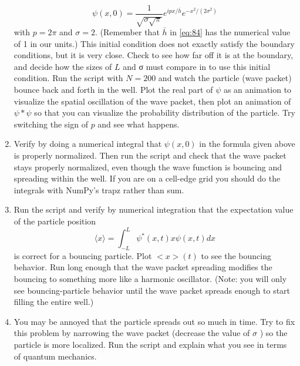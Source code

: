 \begin{problem}
\begin{enumerate}[label=(\alph*)]
\begin{equation}\label{eq:84}
\psi(x, 0)=\frac{1}{\sqrt{\sigma \sqrt{\pi}}} e^{i p x / \bar{h}} e^{-x^{2} /\left(2 \sigma^{2}\right)}
\end{equation}
with $p = 2\pi$ and $\sigma = 2$. (Remember that $ \bar{h}$ in \eqref{eq:84} has the numerical
value of 1 in our units.) This initial condition does not exactly satisfy
the boundary conditions, but it is very close. Check to see how far
off it is at the boundary, and decide how the sizes of $L$ and σ must
compare in to use this initial condition.
Run the script with $N = 200$ and watch the particle (wave packet)
bounce back and forth in the well. Plot the real part of $\psi$ as an animation to visualize the spatial oscillation of the wave packet, then
plot an animation of $\psi * \psi$  so that you can visualize the probability
distribution of the particle. Try switching the sign of $p$ and see what
happens.
\item Verify by doing a numerical integral that $\psi(x,0)$ in the formula given
above is properly normalized. Then run the script and check that
the wave packet stays properly normalized, even though the wave
function is bouncing and spreading within the well. If you are on a
cell-edge grid you should do the integrals with NumPy\rq s trapz rather
than sum.
\item Run the script and verify by numerical integration that the expectation
value of the particle position
\begin{equation}\label{eq:85}
\langle x\rangle=\int_{-L}^{L} \psi^{*}(x, t) x \psi(x, t) d x
\end{equation}
is correct for a bouncing particle. Plot $<x>(t)$ to see the bouncing
behavior. Run long enough that the wave packet spreading modifies
the bouncing to something more like a harmonic oscillator. (Note:
you will only see bouncing-particle behavior until the wave packet
spreads enough to start filling the entire well.)
\item You may be annoyed that the particle spreads out so much in time.
Try to fix this problem by narrowing the wave packet (decrease the
value of $\sigma$ ) so the particle is more localized. Run the script and explain
what you see in terms of quantum mechanics.


\end{enumerate}\end{problem}
